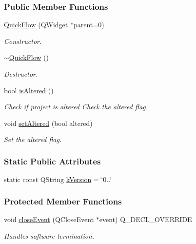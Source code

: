 \subsubsection*{Public Member Functions}
\begin{DoxyCompactItemize}
\item 
\hyperlink{group___window_ga7689e2608835392fce3f4c95a7a542db}{Quick\+Flow} (Q\+Widget $\ast$parent=0)
\begin{DoxyCompactList}\small\item\em Constructor. \end{DoxyCompactList}\item 
\hyperlink{group___window_ga985823a0db64246b3a15eed2f397e0a4}{$\sim$\+Quick\+Flow} ()
\begin{DoxyCompactList}\small\item\em Destructor. \end{DoxyCompactList}\item 
bool \hyperlink{group___window_ga5d9148467ef65c48419bf020ee107a45}{is\+Altered} ()
\begin{DoxyCompactList}\small\item\em Check if project is altered Check the altered flag. \end{DoxyCompactList}\item 
void \hyperlink{group___window_ga4b63ea5ca52a9eea14db0a22b5a133f8}{set\+Altered} (bool altered)
\begin{DoxyCompactList}\small\item\em Set the altered flag. \end{DoxyCompactList}\end{DoxyCompactItemize}
\subsubsection*{Static Public Attributes}
\begin{DoxyCompactItemize}
\item 
static const Q\+String \hyperlink{group___window_gabfc3b1280bdae9a9c046d56b1459ab99}{k\+Version} = \char`\"{}0..\char`\"{}
\end{DoxyCompactItemize}
\subsubsection*{Protected Member Functions}
\begin{DoxyCompactItemize}
\item 
void \hyperlink{group___window_gac8cc1bb329961a0781ffed7b6f2ab402}{close\+Event} (Q\+Close\+Event $\ast$event) Q\+\_\+\+D\+E\+C\+L\+\_\+\+O\+V\+E\+R\+R\+I\+D\+E
\begin{DoxyCompactList}\small\item\em Handles software termination. \end{DoxyCompactList}\end{DoxyCompactItemize}


